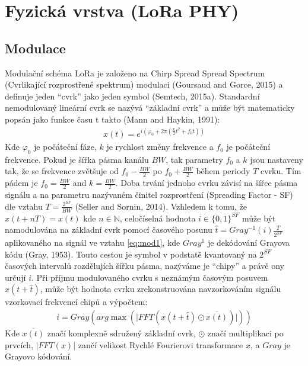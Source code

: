 \documentclass{ctuthesis}
\begin{document}
\section{Fyzická vrstva (LoRa PHY)}
\subsection{Modulace}
Modulační schéma LoRa je založeno na Chirp Spread Spread Spectrum (Cvrlikající rozprostřené spektrum) modulaci  (Goursaud and Gorce, 2015) a definuje jeden “cvrk” jako jeden symbol  (Semtech, 2015a). Standardní nemodulovaný lineární cvrk se nazývá “základní cvrk” a může být matematicky popsán jako funkce času t takto (Mann and Haykin, 1991):
\begin{align}x(t)=e^{i(\varphi_{0}+2\pi(\frac{k}{2}t^{2} + f_{0}t))}
\label{eq:lora1}
\end{align}
Kde  $\varphi_{0}$ je počáteční fáze, $k$ je rychlost změny frekvence a $f_{0}$ je počáteční frekvence. Pokud je šířka pásma kanálu $BW$, tak parametry $f_{0}$ a $k$ jsou nastaveny tak, že se frekvence zvětšuje od $f_{0}-\frac{BW}{2}$ po $f_{0}+\frac{BW}{2}$ během periody $T$ cvrku. Tím pádem je $f_{0}=\frac{BW}{2}$ and $k = \frac{BW}{T}$. Doba trvání jednoho cvrku závisí na šířce pásma signálu a na parametru nazývaném činitel rozprostření (Spreading Factor - SF) dle vztahu $T = \frac{2^{SF}}{BW}$ (Seller and Sornin, 2014).
Vzhledem k tomu, že $x(t + nT) = x(t)$ kde $n\in \mathbb{N}$, celočíselná hodnota $i \in \{0, 1\}^{SF}$ může být namodulována na základní cvrk pomocí časového posunu $\hat{t} = Gray^{-1}(i)\frac{T}{2^{SF}}$ aplikovaného na signál ve vztahu \eqref{eq:mod1},  kde $Gray^{1}$ je dekódování Grayova kódu (Gray, 1953). Touto cestou je symbol v podstatě kvantovaný na $2^{SF}$ časových intervalů rozdělujích šířku pásma, nazýváme je “chipy” a právě ony určují $i$. Při příjmu modulovaného cvrku s neznámým časovým posuvem $x(t + \hat{t})$, může být hodnota cvrku zrekonstruována navzorkováním signálu vzorkovací frekvencí chipů a výpočtem:
\begin{align}i= Gray(arg \max (\lvert FFT(x(t+ \hat{t}) \odot \overline{x(t)}) \rvert ))
\label{eq:lora2}
\end{align}
Kde $\overline{x(t)}$ značí komplexně sdružený základní cvrk, $\odot$ značí multiplikaci po prvcích, $\lvert FFT(x) \rvert$ zančí velikost Rychlé Fourierovi transformace $x$, a $Gray$ je Grayovo kódování. 
\end{document}
